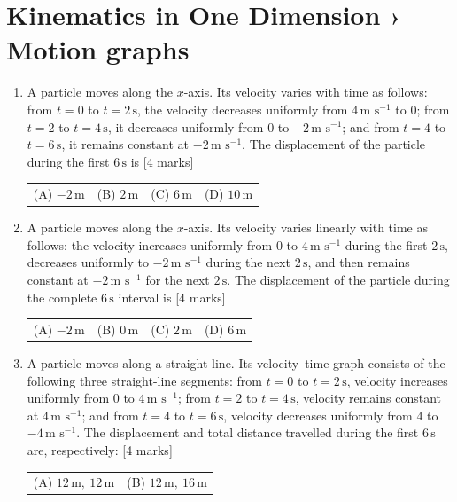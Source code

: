 \documentclass[11pt,a4paper]{article}
\begin{document}
\section*{Kinematics in One Dimension › Motion graphs}
\begin{enumerate}[resume]
\item A particle moves along the $x$-axis. Its velocity varies with time as follows: from $t=0$ to $t=2\,\text{s}$, the velocity decreases uniformly from $4\,\text{m s}^{-1}$ to $0$; from $t=2$ to $t=4\,\text{s}$, it decreases uniformly from $0$ to $-2\,\text{m s}^{-1}$; and from $t=4$ to $t=6\,\text{s}$, it remains constant at $-2\,\text{m s}^{-1}$. The displacement of the particle during the first $6\,\text{s}$ is \hfill [4 marks]
{\renewcommand{\arraystretch}{1.8}
\begin{tabularx}{\linewidth}{X X X X}
(A) \quad $-2\,\text{m}$ & (B) \quad $2\,\text{m}$ & (C) \quad $6\,\text{m}$ & (D) \quad $10\,\text{m}$ \\[10pt]
\end{tabularx}}
\item A particle moves along the $x$-axis. Its velocity varies linearly with time as follows: the velocity increases uniformly from $0$ to $4\,\text{m s}^{-1}$ during the first $2\,\text{s}$, decreases uniformly to $-2\,\text{m s}^{-1}$ during the next $2\,\text{s}$, and then remains constant at $-2\,\text{m s}^{-1}$ for the next $2\,\text{s}$. The displacement of the particle during the complete $6\,\text{s}$ interval is \hfill [4 marks]
{\renewcommand{\arraystretch}{1.8}
\begin{tabularx}{\linewidth}{X X X X}
(A) \quad $-2\,\text{m}$ & (B) \quad $0\,\text{m}$ & (C) \quad $2\,\text{m}$ & (D) \quad $6\,\text{m}$ \\[10pt]
\end{tabularx}}
\item A particle moves along a straight line. Its velocity–time graph consists of the following three straight-line segments: from $t=0$ to $t=2\,\text{s}$, velocity increases uniformly from $0$ to $4\,\text{m s}^{-1}$; from $t=2$ to $t=4\,\text{s}$, velocity remains constant at $4\,\text{m s}^{-1}$; and from $t=4$ to $t=6\,\text{s}$, velocity decreases uniformly from $4$ to $-4\,\text{m s}^{-1}$. The displacement and total distance travelled during the first $6\,\text{s}$ are, respectively: \hfill [4 marks]
{\renewcommand{\arraystretch}{1.8}
\begin{tabularx}{\linewidth}{X X}
(A) \quad $12\,\text{m},\ 12\,\text{m}$ & (B) \quad $12\,\text{m},\ 16\,\text{m}$ \\[10pt]

\end{tabularx}}
\end{enumerate}
\end{document}
